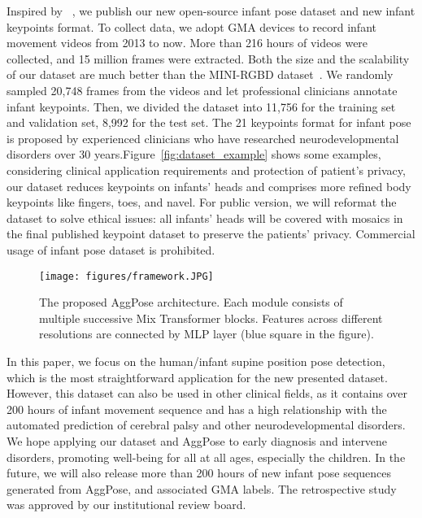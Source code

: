 \documentclass{article}
\begin{document}
Inspired by ~\cite{silva2021future,huang2021invariant}, we publish our new open-source infant pose dataset and new infant keypoints format. To collect data, we adopt GMA devices to record infant movement videos from 2013 to now. More than 216 hours of videos were collected, and 15 million frames were extracted. Both the size and the scalability of our dataset are much better than the MINI-RGBD dataset~\cite{hesse2018computer}. We randomly sampled 20,748 frames from the videos and let professional clinicians annotate infant keypoints. Then, we divided the dataset into 11,756 for the training set and validation set, 8,992 for the test set. The 21 keypoints format for infant pose is proposed by experienced clinicians who have researched neurodevelopmental disorders over 30 years.Figure~\ref{fig:dataset_example} shows some examples, considering clinical application requirements and protection of patient's privacy, our dataset reduces keypoints on infants' heads and comprises more refined body keypoints like fingers, toes, and navel. For public version, we will reformat the dataset to solve ethical issues: all infants' heads will be covered with mosaics in the final published keypoint dataset to preserve the patients' privacy. Commercial usage of infant pose dataset is prohibited.




\begin{figure*}[h]
  \centering
  \texttt{[image: figures/framework.JPG]} 
  \caption{The proposed AggPose architecture. Each module consists of multiple successive Mix Transformer blocks. Features across different resolutions are connected by MLP layer (blue square in the figure).}
  \label{fig:architecture}
\end{figure*}

In this paper, we focus on the human/infant supine position pose detection, which is the most straightforward application for the new presented dataset. However, this dataset can also be used in other clinical fields, as it contains over 200 hours of infant movement sequence and has a high relationship with the automated prediction of cerebral palsy and other  neurodevelopmental disorders. We hope applying our dataset and AggPose to early diagnosis and intervene disorders, promoting well-being for all at all ages, especially the children. In the future, we will also release more than 200 hours of new infant pose sequences generated from AggPose, and associated GMA labels. The retrospective study was approved by our institutional review board.
\end{document}
